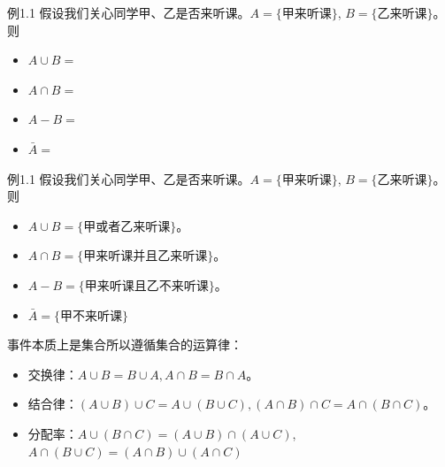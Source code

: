 \documentclass{beamer}
\begin{document}
	\begin{frame}
		例1.1 假设我们关心同学甲、乙是否来听课。$A = \{\text{甲来听课}\}$, $B = \{\text{乙来听课}\}$。则
		\begin{itemize}
			\item $A\cup B =$
			\item $A\cap B =$
			\item $A - B =$
			\item $\bar{A} =$
		\end{itemize}
		
	\end{frame}
	
	\begin{frame}
		例1.1 假设我们关心同学甲、乙是否来听课。$A = \{\text{甲来听课}\}$, $B = \{\text{乙来听课}\}$。则
		\begin{itemize}
			\item $A\cup B = \{\text{甲或者乙来听课}\}$。
			\item $A\cap B = \{\text{甲来听课并且乙来听课}\}$。
			\item $A - B = \{\text{甲来听课且乙不来听课}\}$。
			\item $\bar{A} = \{\text{甲不来听课}\}$
		\end{itemize}
		
		事件本质上是集合所以遵循集合的运算律：
		\begin{itemize}
			\item 交换律：$A\cup B = B\cup A, A\cap B = B\cap A$。
			\item 结合律：$(A\cup B)\cup C = A\cup (B \cup C), (A\cap B)\cap C = A\cap (B \cap C)$。
			\item 分配率：$A \cup ( B \cap C) = (A\cup B)\cap (A \cup C)$, $A \cap ( B \cup C) = (A\cap B)\cup (A \cap C)$
		\end{itemize}
	\end{frame}
	
\end{document}
